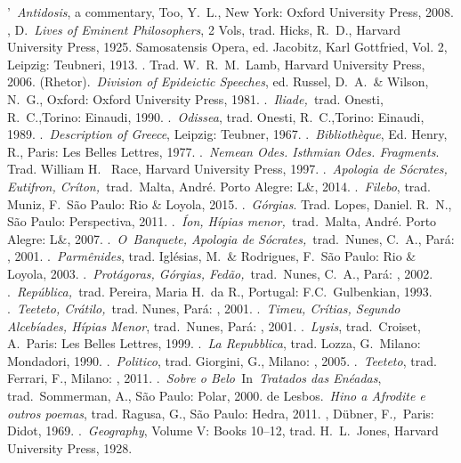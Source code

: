 \begin{bibliohedra}
'~\emph{Antidosis}, a commentary, Too, Y.~L., New York:
  Oxford University Press, 2008.
, D.~\emph{Lives of Eminent Philosophers}, 2 Vols, trad.
  Hicks, R.~D., Harvard University Press, 1925.
 Samosatensis Opera, ed. Jacobitz, Karl Gottfried, Vol. 2,
  Leipzig: Teubneri, 1913.
. Trad. W.~R.~M.~Lamb, Harvard University Press, 2006.
 (Rhetor).~\emph{Division of Epideictic Speeches}, ed. Russel,
  D.~A.~\& Wilson, N.~G., Oxford: Oxford University Press, 1981.
.~\emph{Iliade,~}trad. Onesti, R.~C.,Torino: Einaudi, 1990.
.~\emph{Odissea}, trad. Onesti, R.~C.,Torino: Einaudi, 1989.
.~\emph{Description of Greece}, Leipzig: Teubner, 1967.
.~\emph{Bibliothèque}, Ed. Henry, R., Paris: Les Belles
  Lettres, 1977.
.~\emph{Nemean Odes. Isthmian Odes. Fragments}. Trad. William H.~  Race, Harvard University Press, 1997.
.~\emph{Apologia de Sócrates, Eutifron,
  Críton,~}trad\emph{.}~Malta, André. Porto Alegre: L\&, 2014.
.~\emph{Filebo}, trad. Muniz, F.~São Paulo:  Rio \& Loyola,
  2015.
.~\emph{Górgias}. Trad. Lopes, Daniel. R.~N., São Paulo:
  Perspectiva, 2011.
.\emph{~Íon, Hípias menor,~}trad\emph{.}~Malta, André. Porto
  Alegre: L\&, 2007.
.~\emph{O~Banquete, Apologia de Sócrates,}~trad.~Nunes, C.~A.,
  Pará: , 2001.
.~\emph{Parmênides}, trad. Iglésias, M.~\& Rodrigues, F.~São
  Paulo:  Rio \& Loyola, 2003.
.~\emph{Protágoras, Górgias, Fedão,}~trad.~Nunes, C.~A., Pará:
  , 2002.
.~\emph{República,~}trad. Pereira, Maria H.~da R., Portugal:
  F.C.~Gulbenkian, 1993.
.~\emph{Teeteto, Crátilo,}~trad. Nunes, Pará: , 2001.
.~\emph{Timeu, Crítias, Segundo Alcebíades, Hípias Menor},
  trad.~Nunes, Pará: , 2001.
.~\emph{Lysis}, trad.~Croiset, A.~Paris: Les Belles Lettres,
  1999.
.~\emph{La Repubblica}, trad. Lozza, G.~Milano: Mondadori,
  1990.
.~\emph{Politico}, trad. Giorgini, G., Milano: , 2005.
.~\emph{Teeteto}, trad. Ferrari, F., Milano: , 2011.
.~\emph{Sobre o Belo~}In~\emph{Tratados das Enéadas},
  trad.~Sommerman, A., São Paulo: Polar, 2000.
 de Lesbos.~\emph{Hino a Afrodite e outros poemas}, trad. Ragusa,
  G., São Paulo: Hedra, 2011.
, Dübner, F.\emph{,~}Paris:
  Didot, 1969.
.~\emph{Geography}, Volume V: Books 10--12, trad. H.~L.~Jones,
  Harvard University Press, 1928.
\end{bibliohedra}

